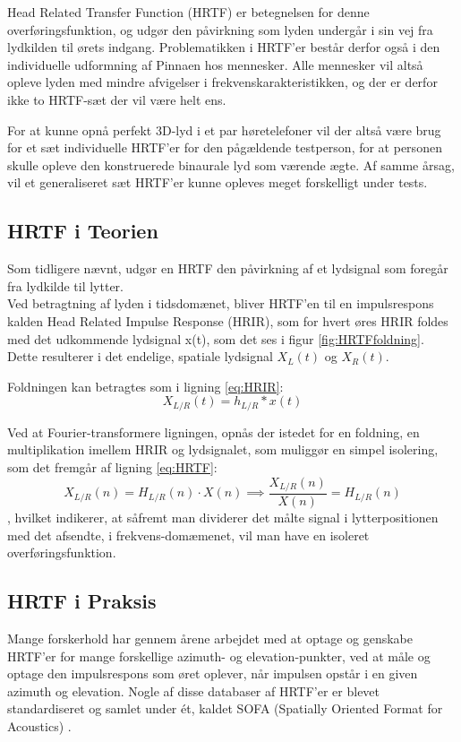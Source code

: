Head Related Transfer Function (HRTF) er betegnelsen for denne overføringsfunktion, og udgør den påvirkning som lyden undergår i sin vej fra lydkilden til ørets indgang. Problematikken i HRTF'er består derfor også i den individuelle udformning af Pinnaen hos mennesker. Alle mennesker vil altså opleve lyden med mindre afvigelser i frekvenskarakteristikken, og der er derfor ikke to HRTF-sæt der vil være helt ens. 

For at kunne opnå perfekt 3D-lyd i et par høretelefoner vil der altså være brug for et sæt individuelle HRTF'er for den pågældende testperson, for at personen skulle opleve den konstruerede binaurale lyd som værende ægte. Af samme årsag, vil et generaliseret sæt HRTF'er kunne opleves meget forskelligt under tests. 

\subsection{HRTF i Teorien}
Som tidligere nævnt, udgør en HRTF den påvirkning af et lydsignal som foregår fra lydkilde til lytter. \\
Ved betragtning af lyden i tidsdomænet, bliver HRTF'en til en impulsrespons kalden Head Related Impulse Response (HRIR), som for hvert øres HRIR foldes med det udkommende lydsignal x(t), som det ses i figur \ref{fig:HRTFfoldning}. Dette resulterer i det endelige, spatiale lydsignal $X_L(t)$ og $X_R(t)$.


Foldningen kan betragtes som i ligning \ref{eq:HRIR}:
\begin{equation}\label{eq:HRIR}
	X_{L/R}(t)=h_{L/R}*x(t)
	\end{equation}
	
	Ved at Fourier-transformere ligningen, opnås der istedet for en foldning, en multiplikation imellem HRIR og lydsignalet, som muliggør en simpel isolering, som det fremgår af ligning \ref{eq:HRTF}:
	\begin{equation}\label{eq:HRTF}
		X_{L/R}(n)=H_{L/R}(n)\cdot X(n) \implies \frac{X_{L/R}(n)}{X(n)}=H_{L/R}(n)
	\end{equation}
	, hvilket indikerer, at såfremt man dividerer det målte signal i lytterpositionen med det afsendte, i frekvens-domæmenet, vil man have en isoleret overføringsfunktion. 
	
	\subsection{HRTF i Praksis}
Mange forskerhold har gennem årene arbejdet med at optage og genskabe HRTF'er for mange forskellige azimuth- og elevation-punkter, ved at måle og optage den impulsrespons som øret oplever, når impulsen opstår i en given azimuth og elevation. Nogle af disse databaser af HRTF'er er blevet standardiseret og samlet under ét, kaldet SOFA (Spatially Oriented Format for Acoustics) \cite{SOFA}. 

